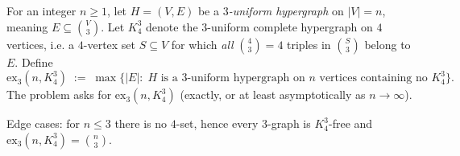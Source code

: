 For an integer $n\ge 1$, let $H=(V,E)$ be a \emph{$3$-uniform hypergraph} on $\lvert V\rvert=n$, meaning $E\subseteq \binom{V}{3}$. Let $K_4^3$ denote the $3$-uniform complete hypergraph on $4$ vertices, i.e. a $4$-vertex set $S\subseteq V$ for which \emph{all} $\binom{4}{3}=4$ triples in $\binom{S}{3}$ belong to $E$. Define
\[
\mathrm{ex}_3(n,K_4^3)\;:=\;\max\{\lvert E\rvert:\; H\text{ is a $3$-uniform hypergraph on $n$ vertices containing no }K_4^3\}.
\]
The problem asks for $\mathrm{ex}_3(n,K_4^3)$ (exactly, or at least asymptotically as $n\to\infty$).

Edge cases: for $n\le 3$ there is no $4$-set, hence every $3$-graph is $K_4^3$-free and $\mathrm{ex}_3(n,K_4^3)=\binom{n}{3}$.
